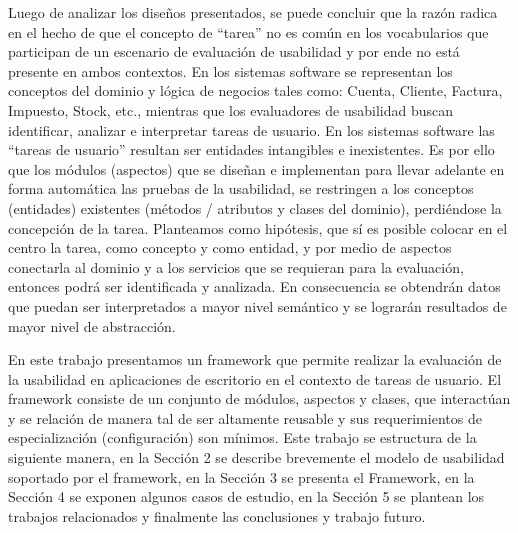 Luego de analizar los diseños presentados, se puede concluir que la razón radica en el hecho de que el concepto de “tarea” no es común en los vocabularios que participan de un escenario de evaluación de usabilidad y por ende no está presente en ambos contextos. En los sistemas software se representan los conceptos del dominio y lógica de negocios tales como: Cuenta, Cliente, Factura, Impuesto, Stock, etc., mientras que los evaluadores de usabilidad buscan identificar, analizar e interpretar  tareas de usuario. En los sistemas software  las “tareas de usuario” resultan ser entidades intangibles e inexistentes. Es por ello que los módulos (aspectos) que se diseñan e implementan para llevar adelante en forma automática las pruebas de la usabilidad, se restringen a los conceptos (entidades) existentes (métodos / atributos y clases del dominio), perdiéndose la concepción de la tarea. Planteamos como hipótesis, que sí es posible colocar en el centro la tarea, como concepto y como entidad, y por medio de aspectos conectarla al dominio y a los servicios que se requieran para la evaluación, entonces podrá ser identificada y analizada. En consecuencia se obtendrán datos que puedan ser interpretados a mayor nivel semántico y se lograrán resultados de mayor nivel de abstracción. 

En este trabajo presentamos un framework que permite realizar la evaluación de la usabilidad en aplicaciones de escritorio en el contexto de tareas de usuario. El framework consiste de un conjunto de módulos, aspectos y clases, que interactúan y se relación de manera tal de ser altamente reusable y sus requerimientos de especialización (configuración) son mínimos. 
Este trabajo se estructura de la siguiente manera, en la Sección 2 se describe brevemente el modelo de usabilidad soportado por el framework, en la Sección 3 se presenta el Framework, en la Sección 4 se exponen algunos casos de estudio, en la Sección 5 se plantean los trabajos relacionados y finalmente las conclusiones y trabajo futuro. 
